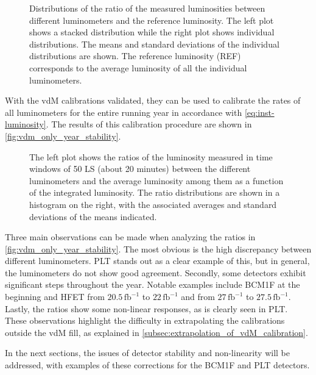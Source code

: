 \begin{figure}[!htb]
	\centering
	\caption[vdM luminosity ratio distributions]{Distributions of the ratio of the measured luminosities between different luminometers and the reference luminosity. The left plot shows a stacked distribution while the right plot shows individual distributions. The means and standard deviations of the individual distributions are shown. The reference luminosity (REF) corresponds to the average luminosity of all the individual luminometers.}
	\label{fig:vdm_ratio_histograms}
\end{figure}

With the vdM calibrations validated, they can be used to calibrate the rates of all luminometers for the entire running year in accordance with \autoref{eq:inst-luminosity}. The results of this calibration procedure are shown in \autoref{fig:vdm_only_year_stability}.

\begin{figure}[!htb]
	\centering
	\caption[Full year luminosity ratios with only vdM calibration]{The left plot shows the ratios of the luminosity measured in time windows of 50 LS (about 20 minutes) between the different luminometers and the average luminosity among them as a function of the integrated luminosity. The ratio distributions are shown in a histogram on the right, with the associated averages and standard deviations of the means indicated.}
	\label{fig:vdm_only_year_stability}
\end{figure}

Three main observations can be made when analyzing the ratios in \autoref{fig:vdm_only_year_stability}. The most obvious is the high discrepancy between different luminometers. PLT stands out as a clear example of this, but in general, the luminometers do not show good agreement. Secondly, some detectors exhibit significant steps throughout the year. Notable examples include BCM1F at the beginning and HFET from \(20.5 \, \text{fb}^{-1}\) to \(22 \, \text{fb}^{-1}\) and from \(27 \, \text{fb}^{-1}\) to \(27.5 \, \text{fb}^{-1}\). Lastly, the ratios show some non-linear responses, as is clearly seen in PLT. These observations highlight the difficulty in extrapolating the calibrations outside the vdM fill, as explained in \autoref{subsec:extrapolation_of_vdM_calibration}.

In the next sections, the issues of detector stability and non-linearity will be addressed, with examples of these corrections for the BCM1F and PLT detectors.

